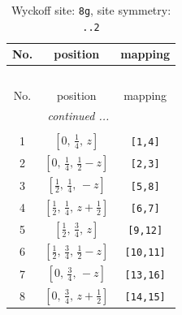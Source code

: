 \documentclass[fleqn,8pt]{jsarticle}
\begin{document}
\begin{longtable}{ccc}
\caption{Wyckoff site: {\tt 8g}, site symmetry: {\tt ..2}}
 \\
 \hline \hline
No. & position & mapping \\ \hline \endfirsthead

\multicolumn{2}{l}{\tablename\ \thetable{}} \\
 \hline \hline
No. & position & mapping \\ \hline \endhead

 \hline \hline
\multicolumn{2}{r}{\footnotesize\it continued ...} \\ \endfoot

 \hline \hline
\multicolumn{2}{r}{} \\ \endlastfoot

1 & $\left[ 0,\, \frac{1}{4},\, z \right]$ & {\tt [1,4]} \\ \hline
2 & $\left[ 0,\, \frac{1}{4},\, \frac{1}{2} - z \right]$ & {\tt [2,3]} \\ \hline
3 & $\left[ \frac{1}{2},\, \frac{1}{4},\, - z \right]$ & {\tt [5,8]} \\ \hline
4 & $\left[ \frac{1}{2},\, \frac{1}{4},\, z + \frac{1}{2} \right]$ & {\tt [6,7]} \\ \hline
5 & $\left[ \frac{1}{2},\, \frac{3}{4},\, z \right]$ & {\tt [9,12]} \\ \hline
6 & $\left[ \frac{1}{2},\, \frac{3}{4},\, \frac{1}{2} - z \right]$ & {\tt [10,11]} \\ \hline
7 & $\left[ 0,\, \frac{3}{4},\, - z \right]$ & {\tt [13,16]} \\ \hline
8 & $\left[ 0,\, \frac{3}{4},\, z + \frac{1}{2} \right]$ & {\tt [14,15]} \\
\end{longtable}
\renewcommand{\arraystretch}{1.2}
\end{document}
